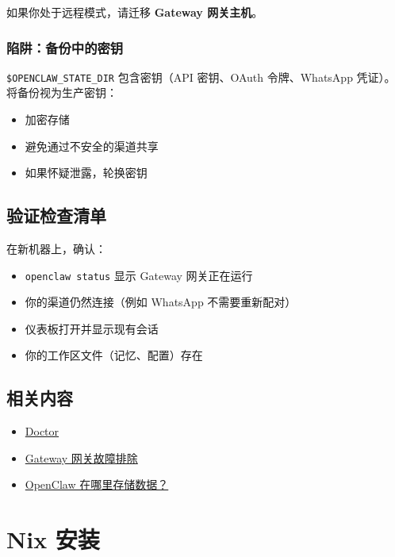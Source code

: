 如果你处于远程模式，请迁移 \textbf{Gateway 网关主机}。

\subsubsection{陷阱：备份中的密钥}


\texttt{\$OPENCLAW\_STATE\_DIR} 包含密钥（API 密钥、OAuth 令牌、WhatsApp 凭证）。将备份视为生产密钥：

\begin{itemize}
  \item 加密存储
  \item 避免通过不安全的渠道共享
  \item 如果怀疑泄露，轮换密钥
\end{itemize}


\subsection{验证检查清单}


在新机器上，确认：

\begin{itemize}
  \item \texttt{openclaw status} 显示 Gateway 网关正在运行
  \item 你的渠道仍然连接（例如 WhatsApp 不需要重新配对）
  \item 仪表板打开并显示现有会话
  \item 你的工作区文件（记忆、配置）存在
\end{itemize}


\subsection{相关内容}


\begin{itemize}
  \item \href{/gateway/doctor}{Doctor}
  \item \href{/gateway/troubleshooting}{Gateway 网关故障排除}
  \item \href{/help/faq\#where-does-openclaw-store-its-data}{OpenClaw 在哪里存储数据？}
\end{itemize}



\clearpage

\section{Nix 安装}


